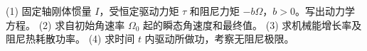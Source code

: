 (1) 固定轴刚体惯量 \(I\)，受恒定驱动力矩 \(\tau\) 和阻尼力矩 \(-b\Omega\)，\(b>0\)。写出动力学方程。
(2) 求自初始角速率 \(\Omega_0\) 起的瞬态角速度和最终值。
(3) 求机械能增长率及阻尼热耗散功率。
(4) 求时间 \(t\) 内驱动所做功，考察无阻尼极限。
